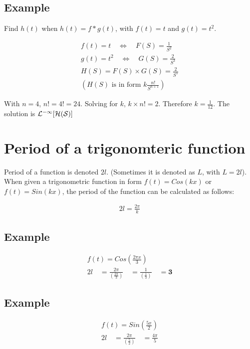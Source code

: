 \documentclass[12pt, a4paper]{article}
\begin{document}
\author{Kevin O'Brien}
\tableofcontents

\subsection{Example}
Find $h(t)$ when $h(t) = f*g(t)$, with $f(t)= t$ and $g(t)=
t^2$.\newline

\begin{eqnarray}
f(t) = t \quad \Leftrightarrow \quad F(S)= \frac{1}{S^2}
 \nonumber\\
g(t) = t^2 \quad \Leftrightarrow \quad G(S)= \frac{2}{S^3}
 \nonumber\\
H(S) = F(S)\times G(S) = \frac{2}{S^5}
 \nonumber\\
(H(S) \mbox{ is in form }  k\frac{n!}{S^{n+1}} )
 \nonumber
\end{eqnarray}

With $n=4$, $n!= 4! = 24$. Solving for $k$, $k \times n! = 2$.
Therefore $k=\frac{1}{12}$. The solution is $\cal{L}^{-1}[H(S)]$

\section{Period of a trigonomteric function}
Period of a function is denoted $2l$. (Sometimes it is denoted as
$L$, with $L=2l$). \newline When given a trigonometric function in
form $f(t) = Cos(kx)$ or $f(t)= Sin(kx)$, the period of the
function can be calculated as follows:

\begin{eqnarray}
2l = \frac{2 \pi}{k}\nonumber
\end{eqnarray}



\subsection{Example}
\begin{eqnarray}f(t) = Cos(\frac{2 \pi x}{3}) \nonumber\\
2l \quad=\frac{2\pi}{(\frac{2\pi}{3})}\quad =
\frac{1}{(\frac{1}{3})}\quad= \textbf{3}\nonumber
\end{eqnarray}

\subsection{Example}
\begin{eqnarray}f(t) = Sin(\frac{5x}{2}) \nonumber\\
2l \quad=\frac{2\pi}{(\frac{5}{2})}\quad = \frac{4\pi}{5}\nonumber
\end{eqnarray}
\end{document}
